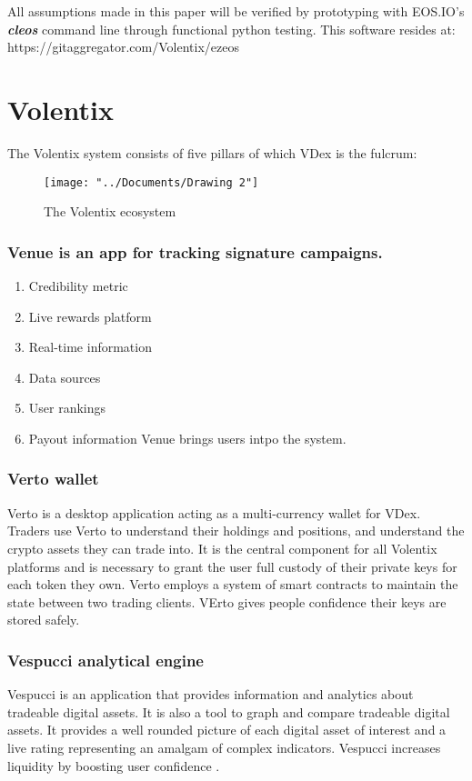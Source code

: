 \documentclass[]{article}
\begin{document}
All assumptions made in this paper will be verified by prototyping
with EOS.IO's \textbf{\textit{cleos}} command line through functional python testing. This software resides at: https://gitaggregator.com/Volentix/ezeos

\section{Volentix}	
The Volentix system consists of five pillars of which VDex is the fulcrum:
\begin{figure}
	\centering
	\texttt{[image: "../Documents/Drawing 2"]}
	\caption{The Volentix ecosystem}
	\label{fig:drawing-2}
\end{figure}
\subsubsection {Venue is an app for tracking signature campaigns.}
\begin{enumerate}
\item Credibility metric
\item Live rewards platform
\item Real-time information
\item Data sources
\item User rankings
\item Payout information
Venue brings users intpo the system.
\end{enumerate}
\subsubsection {Verto wallet}
Verto is a desktop application acting as a multi-currency wallet for VDex. Traders use Verto to understand their holdings and positions, and understand the crypto assets they can trade into. It is the central component for all Volentix platforms and is necessary to grant the user full custody of their private keys for each token they own.
Verto employs a system of smart contracts to maintain the state between two trading clients.
VErto gives people confidence their keys are stored safely.

\subsubsection {Vespucci analytical engine}
Vespucci is an application that provides information and analytics about tradeable digital assets. It is also a tool to graph and compare tradeable digital assets. It provides a well rounded picture of each digital asset of interest and a live rating representing an amalgam of complex indicators.
Vespucci increases liquidity by boosting user confidence .
\end{document}

